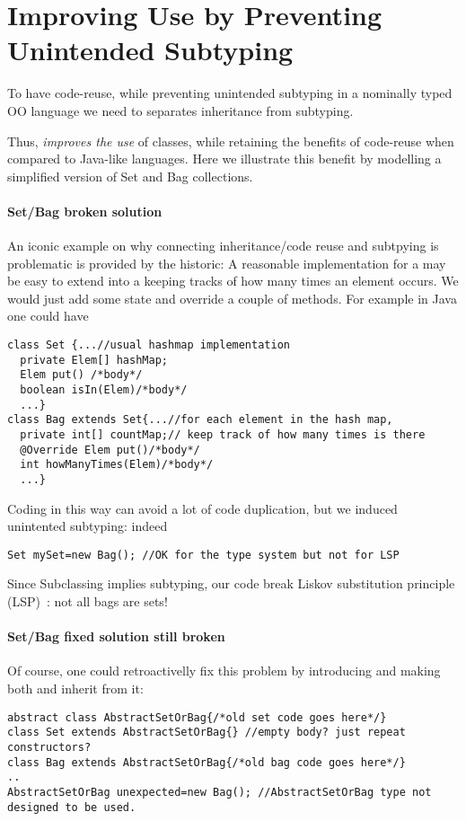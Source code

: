 \section{Improving Use by Preventing Unintended Subtyping}

To have code-reuse, while preventing unintended subtyping
in a nominally typed OO language we need to
 separates inheritance from subtyping.

Thus, \name  \emph{improves the use} of classes, while
retaining the benefits of code-reuse when compared to Java-like languages. 
Here we illustrate this benefit by modelling a simplified version of
Set and Bag collections. 

\paragraph{Set/Bag broken solution}
An iconic example on why connecting inheritance/code reuse and
subtpying is problematic is provided by the
historic\cite{LaLonde:1991:SSS:110673.110679}: A reasonable
implementation for a \Q@Set@ may be easy to extend into a \Q@Bag@
keeping tracks of how many times an element occurs.  We would just add
some state and override a couple of methods.
For example in Java one could have

\begin{lstlisting}
class Set {...//usual hashmap implementation
  private Elem[] hashMap;
  Elem put() /*body*/
  boolean isIn(Elem)/*body*/
  ...}
class Bag extends Set{...//for each element in the hash map,
  private int[] countMap;// keep track of how many times is there
  @Override Elem put()/*body*/
  int howManyTimes(Elem)/*body*/
  ...}\end{lstlisting}

Coding \Q@Bag@ in this way can avoid a lot of code duplication, but we induced unintented subtyping: indeed

\begin{lstlisting}
Set mySet=new Bag(); //OK for the type system but not for LSP
\end{lstlisting}
Since Subclassing implies subtyping, our code break Liskov substitution principle (LSP)~\cite{martin2000design}: not all bags are sets!

\paragraph{Set/Bag fixed solution still broken}
Of course, one could retroactivelly fix this problem by introducing \Q@AbstractSetOrBag@
and making both \Q@Bag@ and \Q@Set@ inherit from it:
\begin{lstlisting}
abstract class AbstractSetOrBag{/*old set code goes here*/}
class Set extends AbstractSetOrBag{} //empty body? just repeat constructors?
class Bag extends AbstractSetOrBag{/*old bag code goes here*/}
..
AbstractSetOrBag unexpected=new Bag(); //AbstractSetOrBag type not designed to be used.
\end{lstlisting}

